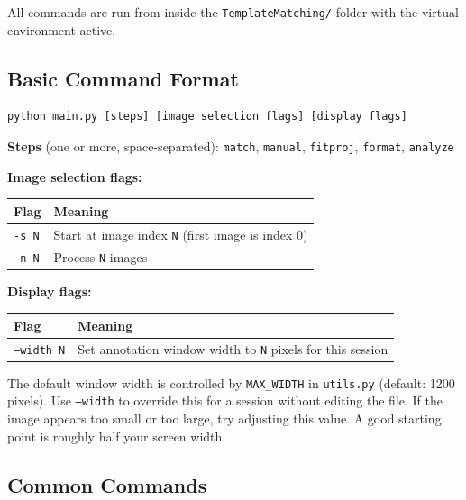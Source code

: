 \documentclass[11pt, letterpaper]{article}
\begin{document}
All commands are run from inside the \texttt{TemplateMatching/} folder with the virtual
environment active.

\subsection*{Basic Command Format}

\begin{lstlisting}
python main.py [steps] [image selection flags] [display flags]
\end{lstlisting}

\textbf{Steps} (one or more, space-separated): \texttt{match}, \texttt{manual},
\texttt{fitproj}, \texttt{format}, \texttt{analyze}

\textbf{Image selection flags:}
\begin{center}
\begin{tabular}{ll}
\toprule
\textbf{Flag} & \textbf{Meaning} \\
\midrule
\texttt{-s N} & Start at image index \texttt{N} (first image is index 0) \\
\texttt{-n N} & Process \texttt{N} images \\
\bottomrule
\end{tabular}
\end{center}

\textbf{Display flags:}
\begin{center}
\begin{tabular}{ll}
\toprule
\textbf{Flag} & \textbf{Meaning} \\
\midrule
\texttt{--width N} & Set annotation window width to \texttt{N} pixels for this session \\
\bottomrule
\end{tabular}
\end{center}

The default window width is controlled by \texttt{MAX\_WIDTH} in \texttt{utils.py} (default: 1200 pixels).
Use \texttt{--width} to override this for a session without editing the file. If the image appears
too small or too large, try adjusting this value. A good starting point is roughly half your screen
width.

\subsection*{Common Commands}
\end{document}
